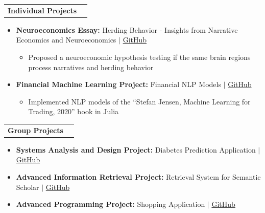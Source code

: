 \documentclass[letterpaper,11pt]{article}
\makeatletter
\newcommand{\resumeItem}[1]{
  \item\small{
    {#1 \vspace{-2pt}}
  }
}
\newcommand{\resumeProjectHeading}[2]{
    \vspace{-2pt}\item
    \begin{tabular*}{0.97\textwidth}{l@{\extracolsep{\fill}}r}
      \small#1 & #2 \\
    \end{tabular*}\vspace{-7pt}
}
\newcommand{\resumeItemListStart}{\begin{itemize}}
\newcommand{\resumeItemListEnd}{\end{itemize}\vspace{-5pt}}
\makeatother
\begin{document}
    \resumeProjectHeading{\textbf{Individual Projects}}{}
    \resumeItemListStart
        \resumeItem{\textbf{Neuroeconomics Essay:} Herding Behavior - Insights from Narrative Economics and Neuroeconomics $|$ \href{https://github.com/AmBadAl/Neuroeconomics-Essay}{\color{myblue}GitHub}}
        \resumeItemListStart
            \resumeItem{Proposed a neuroeconomic hypothesis testing if the same brain regions process narratives and herding behavior}
            \vspace{4pt}
        \resumeItemListEnd
        \resumeItem{\textbf{Financial Machine Learning Project:} Financial NLP Models $|$ \href{https://github.com/AmBadAl/Financial-NLP-Models}{\color{myblue}GitHub}}
        \resumeItemListStart
            \resumeItem{Implemented NLP models of the \enquote{Stefan Jensen, Machine Learning for Trading, 2020} book in Julia}
            \vspace{1pt}
        \resumeItemListEnd
  \resumeItemListEnd

  \resumeProjectHeading{\textbf{Group Projects}}{}
    \resumeItemListStart
        \resumeItem{\textbf{Systems Analysis and Design Project:} Diabetes Prediction Application $|$ \href{https://github.com/AmBadAl/Diabetes}{\color{myblue}GitHub}}
        \resumeItem{\textbf{Advanced Information Retrieval Project:} Retrieval System for Semantic Scholar $|$ \href{https://github.com/sudoparsa/information-retrieval}{\color{myblue}GitHub}}
        \resumeItem{\textbf{Advanced Programming Project:} Shopping Application $|$ \href{https://github.com/AdvProg2020/Project_team-30}{\color{myblue}GitHub}}
  \resumeItemListEnd

    
\end{document}
